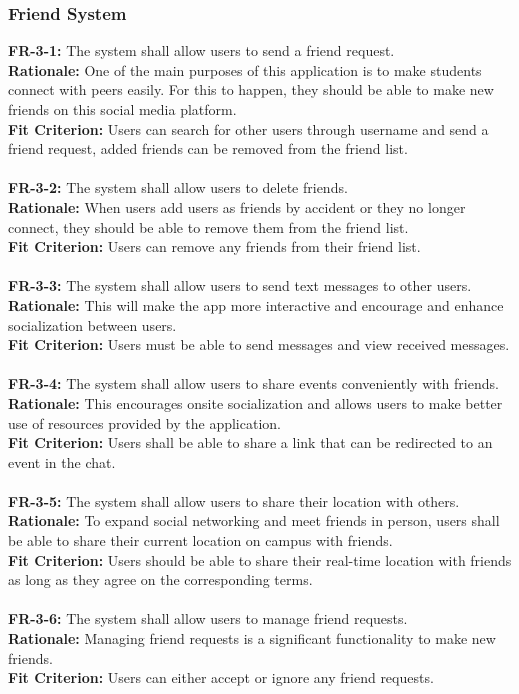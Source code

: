 \documentclass[12pt]{article}
\begin{document}
\subsubsection{Friend System}
    \textbf{FR-3-1:} The system shall allow users to send a friend request.\\
    \textbf{Rationale:} One of the main purposes of this application is to make students connect with peers easily. For this to happen, they should be able to make new friends on this social media platform.\\
    \textbf{Fit Criterion:} Users can search for other users through username and send a friend request, added friends can be removed from the friend list.\\\\
    \textbf{FR-3-2:} The system shall allow users to delete friends.\\
    \textbf{Rationale:} When users add users as friends by accident or they no longer connect, they should be able to remove them from the friend list.\\
    \textbf{Fit Criterion:} Users can remove any friends from their friend list.\\\\
    \textbf{FR-3-3:} The system shall allow users to send text messages to other users.\\
    \textbf{Rationale:} This will make the app more interactive and encourage and enhance socialization between users.\\
    \textbf{Fit Criterion:} Users must be able to send messages and view received messages.\\\\
    \textbf{FR-3-4:} The system shall allow users to share events conveniently with friends.\\
    \textbf{Rationale:} This encourages onsite socialization and allows users to make better use of resources provided by the application.\\
    \textbf{Fit Criterion:} Users shall be able to share a link that can be redirected to an event in the chat.\\\\
    \textbf{FR-3-5:} The system shall allow users to share their location with others.\\
    \textbf{Rationale:} To expand social networking and meet friends in person, users shall be able to share their current location on campus with friends.\\
    \textbf{Fit Criterion:} Users should be able to share their real-time location with friends as long as they agree on the corresponding terms.\\\\
    \textbf{FR-3-6:} The system shall allow users to manage friend requests.\\
    \textbf{Rationale:} Managing friend requests is a significant functionality to make new friends.\\
    \textbf{Fit Criterion:} Users can either accept or ignore any friend requests.\\\\
\end{document}
